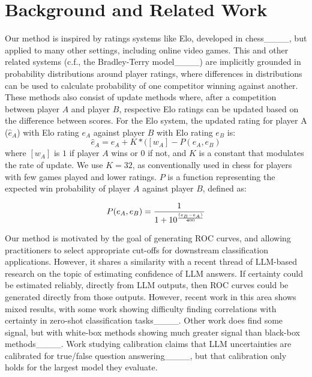 \section{Background and Related Work}
Our method is inspired by ratings systems like Elo, developed in chess____, but applied to many other settings, including online video games.
%
This and other related systems (c.f., the Bradley-Terry model____) are implicitly grounded in probability distributions around player ratings, where differences in distributions can be used to calculate probability of one competitor winning against another.
%
These methods also consist of update methods where, after a competition between player $A$ and player $B$, respective Elo ratings can be updated based on the difference between scores.
%
For the Elo system, the updated rating for player A ($\hat{e}_A$) with Elo rating $e_A$ against player $B$ with Elo rating $e_B$ is:
\begin{equation}
\label{eqn:update}
\hat{e}_A = e_A + K * ([w_A] - P(e_A, e_B)
\end{equation}
where $[w_A]$ is $1$ if player $A$ wins or $0$ if not, and $K$ is a constant that modulates the rate of update.
%
We use $K=32$, as conventionally used in chess for players with few games played and lower ratings.
%
$P$ is a function representing the expected win probability of player $A$ against player $B$, defined as:


\begin{equation}
P(e_A, e_B) = {1 \over 1 + 10^{(e_B-e_A) \over 400}}
\end{equation}

Our method is motivated by the goal of generating ROC curves, and allowing practitioners to select appropriate cut-offs for downstream classification applications.
%
However, it shares a similarity with a recent thread of LLM-based research on the topic of estimating confidence of LLM answers.
%
If certainty could be estimated reliably, directly from LLM outputs, then ROC curves could be generated directly from those outputs.
%
However, recent work in this area shows mixed results, with some work showing difficulty finding correlations with certainty in zero-shot classification tasks____.
%
Other work does find some signal, but with white-box methods showing much greater signal than black-box methods____.
%
Work studying calibration claims that LLM uncertainties are calibrated for true/false question answering____, but that calibration only holds for the largest model they evaluate.


